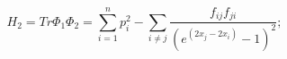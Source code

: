 \begin{equation}\label{H2}
  H_2=Tr \Phi_1 \Phi_2 = \sum_{i=1}^n p_i^2 -  \sum_{i\neq j} \frac
  {f_{ij}f_{ji}} {(e^{(2x_j-2x_i)}-1)^2};
\end{equation}

